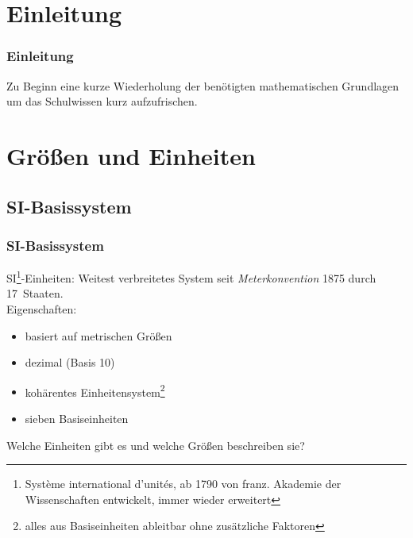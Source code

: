 

\subtitle{Technik Klasse E 01: \\
          Mathematische Grundlagen und Einheiten \\[2em]}
\date{Stand 22.10.2015}


\section{Einleitung}

\begin{frame}
    \frametitle{Einleitung}

    Zu Beginn eine kurze Wiederholung der benötigten mathematischen Grundlagen
    um das Schulwissen kurz aufzufrischen.

\end{frame}

\section{Größen und Einheiten}

\subsection{SI-Basissystem}

\begin{frame}
    \frametitle{SI-Basissystem}

    SI\footnote{Système international d’unités, ab 1790 von franz. Akademie der
    Wissenschaften entwickelt, immer wieder erweitert}-Einheiten: Weitest
    verbreitetes System seit \emph{Meterkonvention} 1875 durch 17~Staaten.
    \\[1em]

    Eigenschaften:

    \begin{itemize}
        \item basiert auf metrischen Größen
        \item dezimal (Basis 10)
        \item kohärentes Einheitensystem\footnote{alles aus Basiseinheiten
              ableitbar ohne zusätzliche Faktoren}
        \item sieben Basiseinheiten
    \end{itemize}

    \bigskip \pause
    Welche Einheiten gibt es und welche Größen beschreiben sie?

\end{frame}


